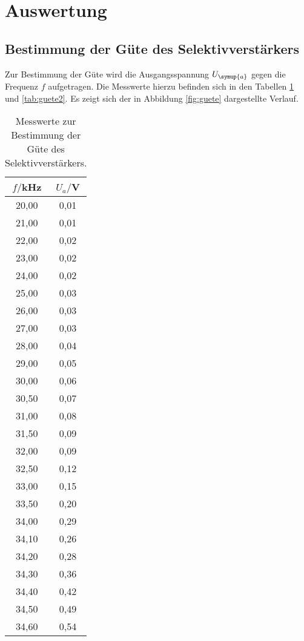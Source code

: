 \section{Auswertung}
\label{sec:Auswertung}

\subsection{Bestimmung der Güte des Selektivverstärkers}
\label{subsec:guete}

Zur Bestimmung der Güte wird die Ausgangsspannung $U_{\symup{a}}$ gegen die Frequenz
$f$ aufgetragen. Die Messwerte hierzu befinden sich in den Tabellen \ref{tab:guete}
und \ref{tab:guete2}. Es zeigt sich der in Abbildung \ref{fig:guete} dargestellte
Verlauf.

\begin{table}[htp]
	\begin{center}
    \caption{Messwerte zur Bestimmung der Güte des Selektivverstärkers.}
    \label{tab:guete}
		\begin{tabular}{cc}
		\toprule
			{$f/$kHz} & {$U_a/$V}\\
			\midrule
			20,00 & 0,01\\
			21,00 & 0,01\\
			22,00 & 0,02\\
			23,00 & 0,02\\
			24,00 & 0,02\\
			25,00 & 0,03\\
			26,00 & 0,03\\
			27,00 & 0,03\\
			28,00 & 0,04\\
			29,00 & 0,05\\
			30,00 & 0,06\\
			30,50 & 0,07\\
			31,00 & 0,08\\
			31,50 & 0,09\\
			32,00 & 0,09\\
			32,50 & 0,12\\
			33,00 & 0,15\\
			33,50 & 0,20\\
			34,00 & 0,29\\
			34,10 & 0,26\\
			34,20 & 0,28\\
			34,30 & 0,36\\
			34,40 & 0,42\\
			34,50 & 0,49\\
			34,60 & 0,54\\

\end{tabular}
\end{center}
\end{table}
